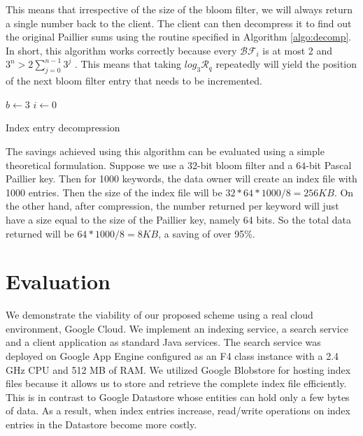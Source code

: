 This means that irrespective of the size
of the bloom filter,
we will always return a single number back to the client. The client can then
decompress it to find out the original Paillier sums using the routine
specified in Algorithm \ref{algo:decomp}. In short, this algorithm works correctly because every
$\mathcal{BF}_i$ is at most 2 and $ 3^{n} > 2\sum_{j=0}^{n-1} 3^{j}$ . This means
that taking $log_3 \mathcal{R}_q$ repeatedly will yield the position of the next
bloom filter entry that needs to be incremented.

\begin{algorithm}
$ b \gets 3 $ \;
$i \gets 0 $\;
\;
 \caption{Index entry decompression}
 \label{algo:decomp}
\end{algorithm}

The savings achieved using this algorithm can be evaluated using a simple theoretical
formulation. Suppose we use a 32-bit bloom filter and a $64$-bit Pascal Paillier key.
Then for 1000 keywords, the data owner will create an index file with 1000 entries.
Then the size of the index file will be $32*64*1000/8 = 256KB$. On the other hand,
after compression, the number returned per keyword will just have a size equal to the
size of the Paillier key, namely 64 bits. So the total data returned will be 
$64*1000/8 = 8KB$, a saving of over 95\%.


\section{Evaluation}
\label{sec:eval}

We demonstrate the viability of our proposed scheme using a real cloud environment, Google Cloud.
We implement an indexing service, a search service and a
client application as standard Java services. The search service was deployed
on Google App Engine configured as an F4 class instance with a 2.4 GHz CPU and 512
MB of RAM. We utilized Google Blobstore for hosting index files because
it allows us to store and retrieve the complete index file efficiently.
This is in contrast to Google Datastore whose
entities can hold only a few bytes of data. As a result, when index entries increase,
read/write operations on index entries in the Datastore become more costly.

